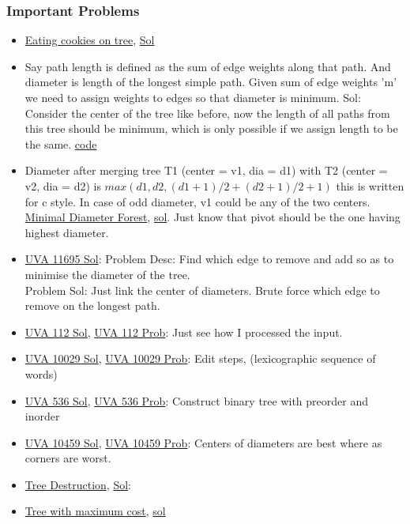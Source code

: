 \documentclass[8pt, a4paper, oneside, twocolumn]{extarticle}
\begin{document}
\subsubsection{Important Problems}
\begin{itemize}
    \item \href{https://codeforces.com/contest/1099/problem/F}{Eating cookies on tree}, \href{https://codeforces.com/blog/entry/64296?#comment-482494}{Sol}
    \item Say path length is defined as the sum of edge weights along that path. And diameter is length of the longest simple path. Given sum of edge weights 'm' we need to assign weights to edges so that diameter is minimum. Sol: Consider the center of the tree like before, now the length of all paths from this tree should be minimum, which is only possible if we assign length to be the same. \href{https://codeforces.com/contest/1086/submission/47400574}{code}
    \item Diameter after merging tree T1 (center = v1, dia = d1) with T2 (center = v2, dia = d2) is $max (d1, d2, (d1 + 1)/2 + (d2 + 1)/2 + 1)$ this is written for c style. In case of odd diameter, v1 could be any of the two centers. \href{https://codeforces.com/contest/1092/problem/E}{Minimal Diameter Forest}, \href{https://gist.github.com/sourabhxyz/39abbe4cf84fcfce62051f1ae0fe4638}{sol}. Just know that pivot should be the one having highest diameter.
	\item \href {https://gist.github.com/sourabhxyz/6cff69fef833097556696bd6f31f3f1d}{UVA 11695 Sol}: Problem Desc: Find which edge to remove and add so as to minimise the diameter of the tree.\\
	Problem Sol: Just link the center of diameters. Brute force which edge to remove on the longest path. 
	\item \href {https://github.com/sourabhxyz/Competitive-Programming/blob/master/UVA_112.cpp}{UVA 112 Sol}, \href {https://uva.onlinejudge.org/external/1/112.pdf}{UVA 112 Prob}: Just see how I processed the input.	
	\item \href {https://gist.github.com/sourabhxyz/6b761c14bef4e5887e6b03b809bc4983}{UVA 10029 Sol}, \href {https://uva.onlinejudge.org/external/100/10029.pdf}{UVA 10029 Prob}: Edit steps, (lexicographic sequence of words)	
	\item \href {https://gist.github.com/sourabhxyz/d73572fab5cf6d390f509d29abf4cd60}{UVA 536 Sol}, \href {https://uva.onlinejudge.org/external/5/536.pdf}{UVA 536 Prob}: Construct binary tree with preorder and inorder	
	\item \href {https://gist.github.com/sourabhxyz/25edb7a7067948832ade9192bd2635ce}{UVA 10459 Sol}, \href {https://uva.onlinejudge.org/external/104/10459.pdf}{UVA 10459 Prob}: Centers of diameters are best where as corners are worst.	
    \item \href{https://codeforces.com/contest/911/problem/F}{Tree Destruction}, \href{https://codeforces.com/contest/911/submission/34122817}{Sol}:
    \item \href{https://codeforces.com/contest/1092/problem/F}{Tree with maximum cost}, \href{https://github.com/sourabhxyz/Competitive-Programming/blob/master/CF/527%20Div3/F.cpp}{sol}
\end{itemize}
\end{document}
